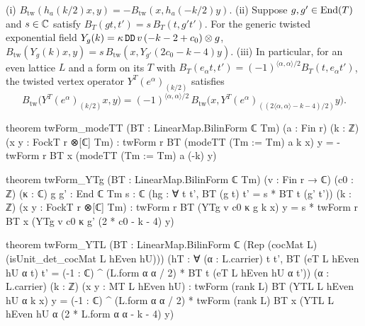 \begin{theorem}\label{ch09:thm:twadj}
\textup{(i)} $B_{\mathrm{tw}}(h_a(k/2)x,y)=-B_{\mathrm{tw}}(x,h_a(-k/2)y)$.
\textup{(ii)} Suppose $g,g'\in\operatorname{End}(T)$ and $s\in{\mathbb{C}}$ satisfy $B_T(gt,t')=s\,B_T(t,g't')$. For the
generic twisted exponential field $Y_g(k)=\kappa\,\lean{DD}\,v\,(-k-2+c_0)\otimes g$,
$B_{\mathrm{tw}}(Y_g(k)x,y)=s\,B_{\mathrm{tw}}(x,Y_{g'}(2c_0-k-4)y)$.
\textup{(iii)} In particular, for an even lattice $L$ and a form on its $T$ with
$B_T(e_\alpha t,t')=(-1)^{\langle\alpha,\alpha\rangle/2}B_T(t,e_\alpha t')$, the twisted vertex
operator $Y^T(e^\alpha)_{(k/2)}$ satisfies
\begin{equation}\label{ch09:eq:YTLadj}
B_{\mathrm{tw}}\big(Y^T(e^\alpha)_{(k/2)}x,y\big)=(-1)^{\langle\alpha,\alpha\rangle/2}\,
B_{\mathrm{tw}}\big(x,Y^T(e^\alpha)_{((2\langle\alpha,\alpha\rangle-k-4)/2)}y\big).
\end{equation}
\end{theorem}
\begin{leancode}
theorem twForm_modeTT (BT : LinearMap.BilinForm ℂ Tm) (a : Fin r) (k : ℤ)
    (x y : FockT r ⊗[ℂ] Tm) :
    twForm r BT (modeTT (Tm := Tm) a k x) y = -twForm r BT x (modeTT (Tm := Tm) a (-k) y)

theorem twForm_YTg (BT : LinearMap.BilinForm ℂ Tm) (v : Fin r → ℂ) (c0 : ℤ) (κ : ℂ)
    {g g' : End ℂ Tm} {s : ℂ} (hg : ∀ t t', BT (g t) t' = s * BT t (g' t')) (k : ℤ)
    (x y : FockT r ⊗[ℂ] Tm) :
    twForm r BT (YTg v c0 κ g k x) y = s * twForm r BT x (YTg v c0 κ g' (2 * c0 - k - 4) y)

theorem twForm_YTL (BT : LinearMap.BilinForm ℂ (Rep (cocMat L) (isUnit_det_cocMat L hEven hU)))
    (hT : ∀ (α : L.carrier) t t', BT (eT L hEven hU α t) t'
      = (-1 : ℂ) ^ (L.form α α / 2) * BT t (eT L hEven hU α t'))
    (α : L.carrier) (k : ℤ) (x y : MT L hEven hU) :
    twForm (rank L) BT (YTL L hEven hU α k x) y
      = (-1 : ℂ) ^ (L.form α α / 2) *
          twForm (rank L) BT x (YTL L hEven hU α (2 * L.form α α - k - 4) y)
\end{leancode}
